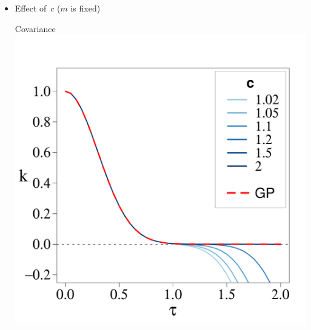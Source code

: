 \documentclass[8pt]{beamer} %
\begin{document}
\begin{frame}

\begin{itemize}\setlength\itemsep{2mm}
\item \normalsize Effect of\, $c$\; ($m$ is fixed)\\[2mm]

\begin{adjustwidth}{-2.7em}{-3em}
\begin{center}
{\scriptsize \hspace{5mm} Covariance \hspace{30mm}  \hspace{27mm} }\\[-4mm]
%
\includegraphics[scale=0.23, trim = 0mm 0mm 0mm 0mm, clip]{ch5_fig2_Cov_L.pdf}

\end{center}
\end{adjustwidth}
\end{itemize}
\end{frame}
\end{document}
